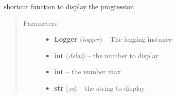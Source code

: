 \documentclass[a4paper,10pt,english]{sphinxmanual}
\begin{document}
\begin{fulllineitems}
\label{commands/apidoc/src:src.fork.batch}
\end{fulllineitems}


\begin{fulllineitems}
\label{commands/apidoc/src:src.fork.batch_salome}
\end{fulllineitems}


\begin{fulllineitems}
\label{commands/apidoc/src:src.fork.launch_command}
\end{fulllineitems}


\begin{fulllineitems}
\label{commands/apidoc/src:src.fork.show_progress}
shortcut function to display the progression
\begin{quote}\begin{description}
\item[{Parameters}] \leavevmode\begin{itemize}
\item {} 
\textbf{Logger} (\emph{logger}) -- The logging instance

\item {} 
\textbf{int} (\emph{delai}) -- the number to display

\item {} 
\textbf{int} -- the number max

\item {} 
\textbf{str} (\emph{ss}) -- the string to display

\end{itemize}

\end{description}\end{quote}

\end{fulllineitems}
\end{document}
